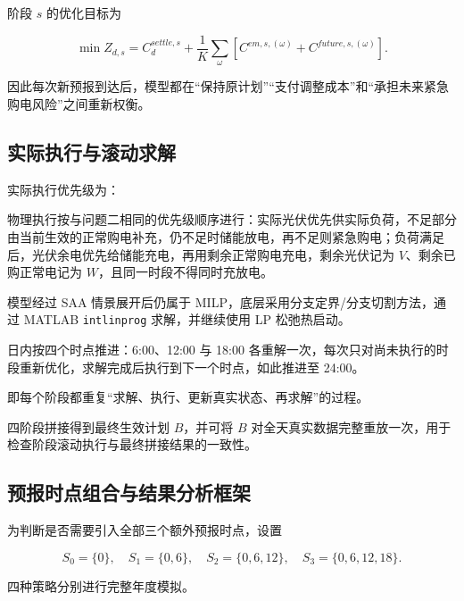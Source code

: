 阶段 \(s\) 的优化目标为

\begin{equation}
\min Z_{d,s}
=
C^{settle,s}_d
+
\frac1K
\sum_{\omega}
\left[
C^{em,s,(\omega)}
+
C^{future,s,(\omega)}
\right].
\end{equation}

因此每次新预报到达后，模型都在“保持原计划”“支付调整成本”和“承担未来紧急购电风险”之间重新权衡。

\subsection{实际执行与滚动求解}

实际执行优先级为：

物理执行按与问题二相同的优先级顺序进行：实际光伏优先供实际负荷，不足部分由当前生效的正常购电补充，仍不足时储能放电，再不足则紧急购电；负荷满足后，光伏余电优先给储能充电，再用剩余正常购电充电，剩余光伏记为 \(V\)、剩余已购正常电记为 \(W\)，且同一时段不得同时充放电。

模型经过 SAA 情景展开后仍属于 MILP，底层采用分支定界/分支切割方法，通过 MATLAB \texttt{intlinprog} 求解，并继续使用 LP 松弛热启动。

日内按四个时点推进：6:00、12:00 与 18:00 各重解一次，每次只对尚未执行的时段重新优化，求解完成后执行到下一个时点，如此推进至 24:00。

即每个阶段都重复“求解、执行、更新真实状态、再求解”的过程。

四阶段拼接得到最终生效计划 \(B\)，并可将 \(B\) 对全天真实数据完整重放一次，用于检查阶段滚动执行与最终拼接结果的一致性。

\subsection{预报时点组合与结果分析框架}

为判断是否需要引入全部三个额外预报时点，设置

\[
S_0=\{0\},
\quad
S_1=\{0,6\},
\quad
S_2=\{0,6,12\},
\quad
S_3=\{0,6,12,18\}.
\]

四种策略分别进行完整年度模拟。


